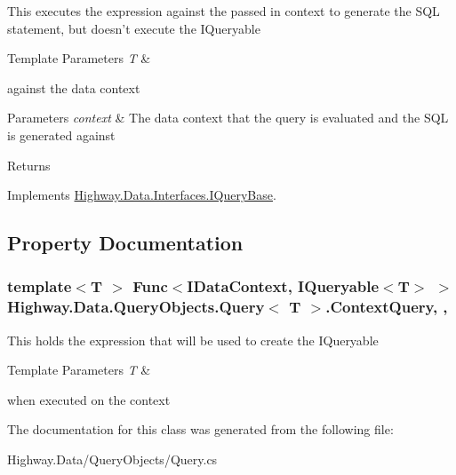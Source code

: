 This executes the expression against the passed in context to generate the S\-Q\-L statement, but doesn't execute the I\-Queryable
\begin{DoxyTemplParams}{Template Parameters}
{\em T} & \\
\hline
\end{DoxyTemplParams}
against the data context 


\begin{DoxyParams}{Parameters}
{\em context} & The data context that the query is evaluated and the S\-Q\-L is generated against\\
\hline
\end{DoxyParams}
\begin{DoxyReturn}{Returns}

\end{DoxyReturn}


Implements \hyperlink{interface_highway_1_1_data_1_1_interfaces_1_1_i_query_base_a151df3073faaf51d98207e2794f62817}{Highway.\-Data.\-Interfaces.\-I\-Query\-Base}.



\subsection{Property Documentation}
\hypertarget{class_highway_1_1_data_1_1_query_objects_1_1_query-g_a68ecc8e5735dee1db60782614427cbbf}{
\subsubsection[{Context\-Query}]{\setlength{\rightskip}{0pt plus 5cm}template$<$T $>$ Func$<${\bf I\-Data\-Context}, I\-Queryable$<$T$>$ $>$ {\bf Highway.\-Data.\-Query\-Objects.\-Query}$<$ T $>$.Context\-Query\hspace{0.3cm}{\ttfamily [get]}, {\ttfamily [set]}, {\ttfamily [protected]}}}\label{class_highway_1_1_data_1_1_query_objects_1_1_query-g_a68ecc8e5735dee1db60782614427cbbf}


This holds the expression that will be used to create the I\-Queryable
\begin{DoxyTemplParams}{Template Parameters}
{\em T} & \\
\hline
\end{DoxyTemplParams}
when executed on the context 



The documentation for this class was generated from the following file\-:\begin{DoxyCompactItemize}
\item 
Highway.\-Data/\-Query\-Objects/Query.\-cs\end{DoxyCompactItemize}
